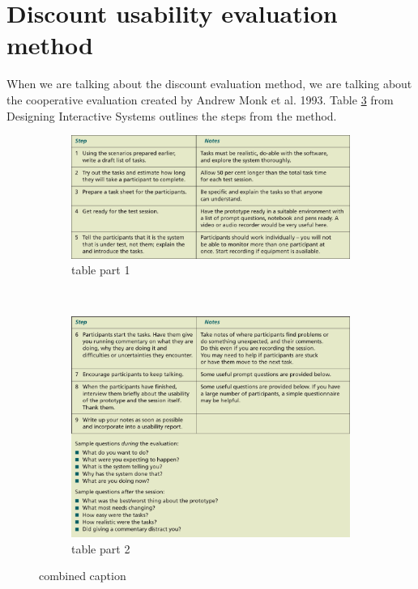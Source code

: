 \section{Discount usability evaluation method}
When we are talking about the discount evaluation method, we are talking about the cooperative evaluation created by Andrew Monk et al. 1993\cite{AndrewMonk}. Table \ref{fig:UsabilityTable} from Designing Interactive Systems\cite{CooperativeEval} outlines the steps from the method.

\begin{figure}[]
  \centering      
    \begin{subfigure}[b]{\textwidth}
    \begin{center}
      \includegraphics[scale=0.5]{./pics/UsabilityTableP1}
      \caption{table part 1}
      \label{fig:UsabilityTableP1}
    \end{center}
    \end{subfigure}
    ~\\
    \begin{subfigure}[b]{\textwidth}
    \begin{center}
      \includegraphics[scale=0.5]{./pics/UsabilityTableP2}
      \caption{table part 2}
      \label{fig:UsabilityTableP2}
    \end{center}
    \end{subfigure}
    \caption{combined caption}
    \label{fig:UsabilityTable}
\end{figure}

